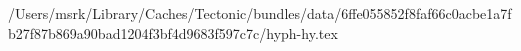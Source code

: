 /Users/msrk/Library/Caches/Tectonic/bundles/data/6ffe055852f8faf66c0acbe1a7fb27f87b869a90bad1204f3bf4d9683f597c7c/hyph-hy.tex